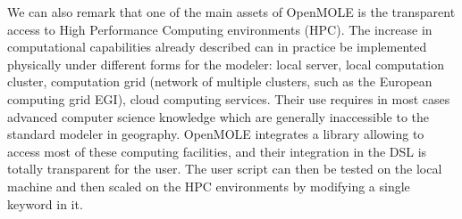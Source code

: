 \documentclass[10pt]{article}
\begin{document}
We can also remark that one of the main assets of OpenMOLE is the transparent access to High Performance Computing environments (HPC). The increase in computational capabilities already described can in practice be implemented physically under different forms for the modeler: local server, local computation cluster, computation grid (network of multiple clusters, such as the European computing grid EGI), cloud computing services. Their use requires in most cases advanced computer science knowledge which are generally inaccessible to the standard modeler in geography. OpenMOLE integrates a library allowing to access most of these computing facilities, and their integration in the DSL is totally transparent for the user. The user script can then be tested on the local machine and then scaled on the HPC environments by modifying a single keyword in it. 
\end{document}
